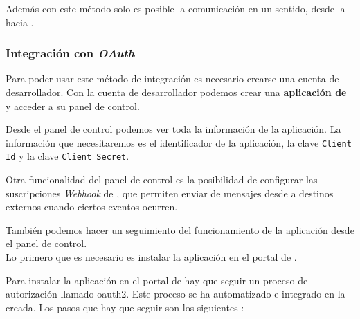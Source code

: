 Además con este método solo es posible la comunicación en un sentido, desde la \iface{} hacia \hs{}.

\subsubsection{Integración con \textit{OAuth}}
\label{subsec:app_hs}

Para poder usar este método de integración es necesario crearse una cuenta de desarrollador. Con la cuenta de desarrollador podemos crear una \textbf{aplicación de \hs{}} y acceder a su panel de control. 

Desde el panel de control podemos ver toda la información de la aplicación. La información que necesitaremos es el identificador de la aplicación, la clave \texttt{Client Id} y la clave \texttt{Client Secret}.

Otra funcionalidad del panel de control es la posibilidad de configurar las suscripciones \textit{Webhook} de \hs{}, que permiten enviar de mensajes desde \hs{} a destinos externos cuando ciertos eventos ocurren.

También podemos hacer un seguimiento del funcionamiento de la aplicación desde el panel de control. \\

Lo primero que es necesario es instalar la aplicación en el portal de \hs{}.

Para instalar la aplicación en el portal de \hs{} hay que seguir un proceso de autorización llamado \gls{oauth2}. Este proceso se ha automatizado e integrado en la \iface{} creada. 
Los pasos que hay que seguir son los siguientes \cite{hsapi}:

